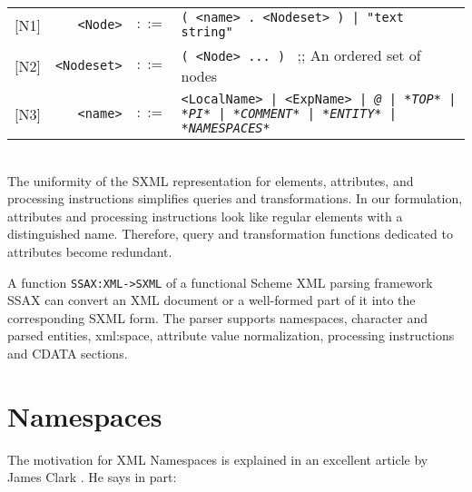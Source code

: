 \documentclass[10pt]{article}
\begin{document}
\begin{tabular}{rrcp{2.8in}}
{[}N1{]} & \texttt{<Node>} &  $::=$ & \texttt{( <name> . <Nodeset> ) | "text string" } \\
{[}N2{]} & \texttt{<Nodeset>} &  $::=$ & \texttt{( <Node> ... ) } ;; An ordered set of nodes\\
{[}N3{]} & \texttt{<name>} &  $::=$ & \texttt{<LocalName> | <ExpName> | \textit{@} | \textit{*TOP*} | \textit{*PI*} | \textit{*COMMENT*} | \textit{*ENTITY*} | \textit{*NAMESPACES*} } \\
\end{tabular}
\\
The uniformity of the SXML representation for elements,
attributes, and processing instructions simplifies queries and
transformations. In our formulation, attributes and processing
instructions look like regular elements with a distinguished
name. Therefore, query and transformation functions dedicated to
attributes become redundant.

A function \texttt{SSAX:XML->SXML} of a functional Scheme XML parsing
framework SSAX \cite{SSAX} can convert an XML document or a
well-formed part of it into the corresponding SXML form. The parser
supports namespaces, character and parsed entities, xml:space,
attribute value normalization, processing instructions and CDATA
sections.

\section{Namespaces}
The motivation for XML Namespaces is explained in an excellent article by James Clark \cite{Clark1999}. He says in part: 
\end{document}
